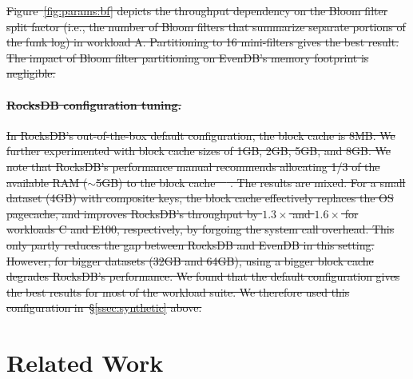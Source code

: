 \documentclass[sigplan,10pt]{acmart}
\newcommand{\inred}[1]{{\color{red}{#1}}}
\newcommand{\remove}[1]{}
\newcommand{\sys}{EvenDB}
\providecommand{\DIFdel}[1]{{\protect\color{red}\sout{#1}}}                      %
\providecommand{\DIFdelend}{} %
\begin{document}
\DIFdel{Figure~\ref{fig:params:bf} depicts the throughput dependency on the Bloom filter split factor (i.e., the 
number of Bloom filters that summarize separate portions of the funk log) in workload A. 
Partitioning to 16 mini-filters gives the best result. %
The impact of Bloom filter partitioning on \sys's %
memory footprint is negligible.
}%

\paragraph{\DIFdel{RocksDB configuration tuning.}} %
\addtocounter{paragraph}{-1}%
\DIFdel{In RocksDB's out-of-the-box default configuration, the block cache is 8MB. 
We further experimented with block cache sizes of 1GB, 2GB, 5GB, and 8GB. We note that 
RocksDB's performance manual recommends allocating 1/3 of the available RAM 
($\sim$5GB) to the block cache~\mbox{%
\cite{RocksDBMemoryTuning}}\hspace{0pt}%
.
The results are mixed. For a small 
dataset (4GB) with composite keys, the block cache effectively replaces 
the OS pagecache, and improves RocksDB's throughput by $1.3\times$ and $1.6\times$
for workloads C and E100, respectively, by forgoing the system call overhead. This only partly reduces the gap between
RocksDB and \sys\/ in this setting. 
However, for  bigger datasets (32GB and 64GB),   using a  bigger block cache degrades  RocksDB's performance. 
We found that the default configuration gives the best results for most of the workload suite. 
We therefore used this configuration  in~\S\ref{ssec:synthetic} above.   
}%

\DIFdel{\remove{
\begin{figure}[htb]
\inred{Eran please add a graph}
\caption{RocksDB's speedup with larger block caches than its default configuration. Results below $1$ indicate slowdown.}
\end{figure}
}
}%

\DIFdelend \section{Related Work}
\label{sec:related}
\end{document}
